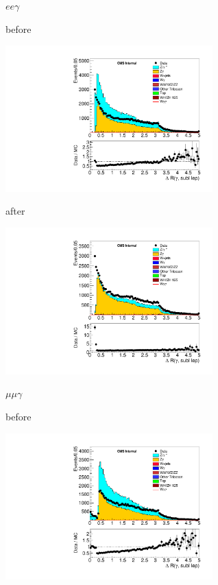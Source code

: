 \documentclass{beamer}
\begin{document}
 {

    \scriptsize

    \bc
        $e e \gamma$

        before

        \includegraphics[width=0.6\textwidth]{Plots/m_leplep_elelph_phsubllepDR.pdf}

        after

        \includegraphics[width=0.6\textwidth]{Plots/m_leplep_elelph_phsubllepDR_oldOlap.pdf}


        $\mu\mu \gamma$

            before
            
        \includegraphics[width=0.6\textwidth]{Plots/m_leplep_mumuph_phsubllepDR.pdf}

}
\end{document}
